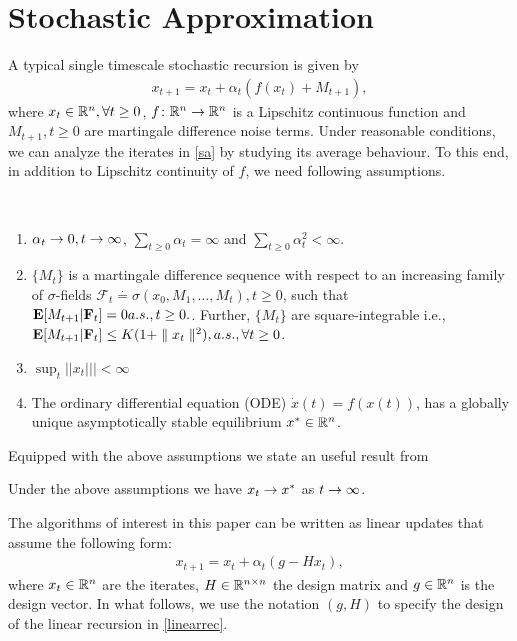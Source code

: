 \section{Stochastic Approximation}
A typical single timescale stochastic recursion is given by 
\begin{align}\label{sa}
x_{t+1}=x_t+\alpha_t(f(x_t)+M_{t+1}),
\end{align}
where $x_t\in \mathbb{R}^n, \forall t\geq 0$, $f\colon \mathbb{R}^n \rightarrow \mathbb{R}^n$ is a Lipschitz continuous function and $M_{t+1}, t\geq 0$ are martingale difference noise terms. Under reasonable conditions, we can analyze the iterates in \eqref{sa} by studying its average behaviour. To this end, in addition to Lipschitz continuity of $f$,  we need following assumptions.\par
\begin{assumption}\label{saassump}\hspace{10pt}\\
\vspace{-20pt}
\begin{enumerate}[leftmargin=*]
\item $\alpha_t\rightarrow 0, t\rightarrow\infty$, $\sum_{t\geq 0}\alpha_t =\infty$ and $\sum_{t\geq 0}\alpha^2_t <\infty$.
\item $\{M_t\}$ is a martingale difference sequence with respect to an increasing family of $\sigma$-fields $\mathcal{F}_t\stackrel{\cdot}{=}\sigma(x_0,M_1,\ldots,M_t),t\geq 0$, such that
$
\mathbf{E}[M_{t+1}|\mathbf{F}_t]=0 a.s., t\geq 0.
$. Further, $\{M_t\}$ are square-integrable i.e., $\mathbf{E}[M_{t+1}|\mathbf{F}_t]\leq K(1+\parallel x_t\parallel^2), a.s., \forall t\geq 0$.
\item $\sup_t||x_t|||<\infty$
\item\label{stab} The ordinary differential equation (ODE) $\dot{x}(t)=f(x(t))$, has a globally unique asymptotically stable equilibrium $x^*\in \mathbb{R}^n$.
\end{enumerate}\end{assumption}
Equipped with the above assumptions we state an useful result from \cite{}
\begin{theorem}\label{sat}
Under the above assumptions we have $x_t\rightarrow x^*$ as $t\rightarrow\infty$. 
\end{theorem}
The algorithms of interest in this paper can be written as linear updates that assume the following form:
\begin{align}\label{linearrec}
x_{t+1}=x_t+\alpha_t(g-Hx_t),
\end{align}
where $x_t\in \mathbb{R}^n$ are the iterates, $H\in \mathbb{R}^{n\times n}$ the design matrix and $g\in \mathbb{R}^n$ is the design vector. In what follows, we use the notation $(g,H)$ to specify the design of the linear recursion in \eqref{linearrec}.
